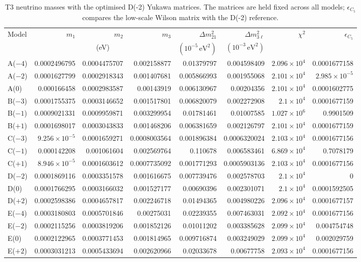 \begin{table}[p]
\centering
\caption{T3 neutrino masses with the optimised D(-2) Yukawa matrices. The matrices are held fixed across all models; $\epsilon_{C_5}$ compares the low-scale Wilson matrix with the D(-2) reference.}
\label{tab:appC_Dm2_masses}
\begingroup
\footnotesize
\setlength{\tabcolsep}{3.2pt}
\begin{tabular}{lrrrrrrr}
\hline
Model & $m_1$ & $m_2$ & $m_3$ & $\Delta m^2_{21}$ & $\Delta m^2_{3\ell}$ & $\chi^2$ & $\epsilon_{C_5}$ \\
 & \multicolumn{3}{c}{(eV)} & $(10^{-5}\,\mathrm{eV}^2)$ & $(10^{-3}\,\mathrm{eV}^2)$ &  &  \\
\hline
A($-4$) & 0.0002496795 & 0.0004475707 & 0.002158877 & 0.01379797 & 0.004598409 & $2.096\times10^{4}$ & 0.0001677158 \\
A($-2$) & 0.0001627799 & 0.0002918343 & 0.001407681 & 0.005866993 & 0.001955068 & $2.101\times10^{4}$ & $2.985\times10^{-5}$ \\
A($0$) & 0.000166458 & 0.0002983587 & 0.00143919 & 0.006130967 & 0.00204356 & $2.101\times10^{4}$ & 0.0001602775 \\
B($-3$) & 0.0001755375 & 0.0003146652 & 0.001517801 & 0.006820079 & 0.002272908 & $2.1\times10^{4}$ & 0.0001677159 \\
B($-1$) & 0.0009021331 & 0.0009959871 & 0.003299954 & 0.01781461 & 0.01007585 & $1.027\times10^{6}$ & 0.9901509 \\
B($+1$) & 0.0001698017 & 0.0003043833 & 0.001468206 & 0.006381659 & 0.002126797 & $2.101\times10^{4}$ & 0.0001677159 \\
C($-3$) & $9.256\times10^{-5}$ & 0.0001659271 & 0.0008003564 & 0.001896384 & 0.0006320024 & $2.103\times10^{4}$ & 0.0001677156 \\
C($-1$) & 0.000142208 & 0.001061604 & 0.002569764 & 0.110678 & 0.006583461 & $6.869\times10^{4}$ & 0.7078179 \\
C($+1$) & $8.946\times10^{-5}$ & 0.0001603612 & 0.0007735092 & 0.001771293 & 0.0005903136 & $2.103\times10^{4}$ & 0.0001677156 \\
D($-2$) & 0.0001869116 & 0.0003351578 & 0.001616675 & 0.007739476 & 0.002578703 & $2.1\times10^{4}$ & 0 \\
D($0$) & 0.0001766295 & 0.0003166032 & 0.001527177 & 0.00690396 & 0.002301071 & $2.1\times10^{4}$ & 0.0001592505 \\
D($+2$) & 0.0002598386 & 0.0004657817 & 0.002246718 & 0.01494365 & 0.004980226 & $2.096\times10^{4}$ & 0.0001677157 \\
E($-4$) & 0.0003180803 & 0.0005701846 & 0.00275031 & 0.02239355 & 0.007463031 & $2.092\times10^{4}$ & 0.0001677156 \\
E($-2$) & 0.0002115256 & 0.0003819206 & 0.001852126 & 0.01011202 & 0.003385628 & $2.099\times10^{4}$ & 0.004754748 \\
E($0$) & 0.0002122965 & 0.0003771453 & 0.001814965 & 0.009716874 & 0.003249029 & $2.099\times10^{4}$ & 0.002029759 \\
E($+2$) & 0.0003031213 & 0.0005433694 & 0.002620966 & 0.02033678 & 0.00677758 & $2.093\times10^{4}$ & 0.0001677156 \\
\hline
\end{tabular}
\endgroup
\end{table}
